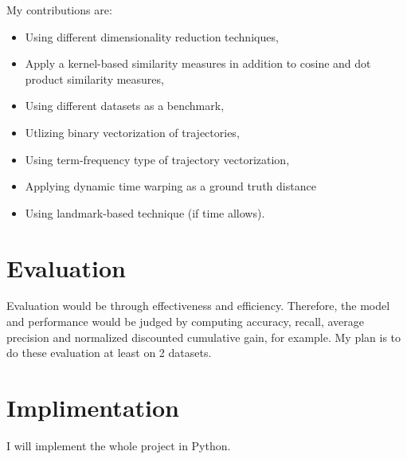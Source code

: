 \documentclass[10pt, twocolumn]{myclass}
\begin{document}
My contributions are:
\begin{itemize}
\item Using different dimensionality reduction techniques, \vspace{-1mm}
\item Apply a kernel-based similarity measures in addition to cosine and dot product similarity measures, \vspace{-1mm}
\item Using different datasets as a benchmark, \vspace{-1mm}
\item Utlizing binary vectorization of trajectories, \vspace{-1mm}
\item Using term-frequency type of trajectory vectorization, \vspace{-1mm} %
\item Applying dynamic time warping as a ground truth distance %
\item Using landmark-based technique (if time allows). 
\end{itemize}



\section{Evaluation}

Evaluation would be through effectiveness and efficiency. Therefore, the model and performance would be judged by computing accuracy, recall, average precision and normalized discounted cumulative gain, for example. My plan is to do these evaluation at least on 2 datasets. 



\section{Implimentation}
I will implement the whole project in Python. 



\end{document}
